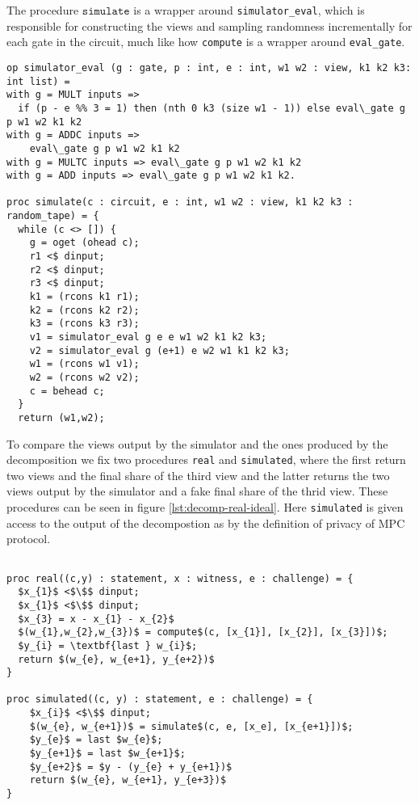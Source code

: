 The procedure $\texttt{simulate}$ is a wrapper around
\texttt{simulator\_eval}, which is responsible for constructing the views and
sampling randomness incrementally for each gate in the circuit, much like how \texttt{compute} is a wrapper around \texttt{eval\_gate}.

\begin{lstlisting}[float,label=lst:zkboo:simulator,caption= Simulator]
op simulator_eval (g : gate, p : int, e : int, w1 w2 : view, k1 k2 k3: int list) =
with g = MULT inputs =>
  if (p - e %% 3 = 1) then (nth 0 k3 (size w1 - 1)) else eval\_gate g p w1 w2 k1 k2
with g = ADDC inputs =>
    eval\_gate g p w1 w2 k1 k2
with g = MULTC inputs => eval\_gate g p w1 w2 k1 k2
with g = ADD inputs => eval\_gate g p w1 w2 k1 k2.

proc simulate(c : circuit, e : int, w1 w2 : view, k1 k2 k3 : random_tape) = {
  while (c <> []) {
    g = oget (ohead c);
    r1 <$ dinput;
    r2 <$ dinput;
    r3 <$ dinput;
    k1 = (rcons k1 r1);
    k2 = (rcons k2 r2);
    k3 = (rcons k3 r3);
    v1 = simulator_eval g e e w1 w2 k1 k2 k3;
    v2 = simulator_eval g (e+1) e w2 w1 k1 k2 k3;
    w1 = (rcons w1 v1);
    w2 = (rcons w2 v2);
    c = behead c;
  }
  return (w1,w2);
\end{lstlisting}

To compare the views output by the simulator and the ones produced by the decomposition we fix two procedures \texttt{real} and \texttt{simulated}, where the first return two views and the final share of the third view and the latter returns the two views output by the simulator and a fake final share of the thrid view. These procedures can be seen in figure \ref{lst:decomp-real-ideal}.
Here \texttt{simulated} is given access to the output of the decompostion as by the definition of privacy of MPC protocol.

\begin{lstlisting}[float, mathescape,label=lst:decomp-real-ideal,caption= Real/Simulated view of decomposition]

proc real((c,y) : statement, x : witness, e : challenge) = {
  $x_{1}$ <$\$$ dinput;
  $x_{1}$ <$\$$ dinput;
  $x_{3} = x - x_{1} - x_{2}$
  $(w_{1},w_{2},w_{3})$ = compute$(c, [x_{1}], [x_{2}], [x_{3}])$;
  $y_{i} = \textbf{last } w_{i}$;
  return $(w_{e}, w_{e+1}, y_{e+2})$
}

proc simulated((c, y) : statement, e : challenge) = {
    $x_{i}$ <$\$$ dinput;
    $(w_{e}, w_{e+1})$ = simulate$(c, e, [x_e], [x_{e+1}])$;
    $y_{e}$ = last $w_{e}$;
    $y_{e+1}$ = last $w_{e+1}$;
    $y_{e+2}$ = $y - (y_{e} + y_{e+1})$
    return $(w_{e}, w_{e+1}, y_{e+3})$
}

\end{lstlisting}

